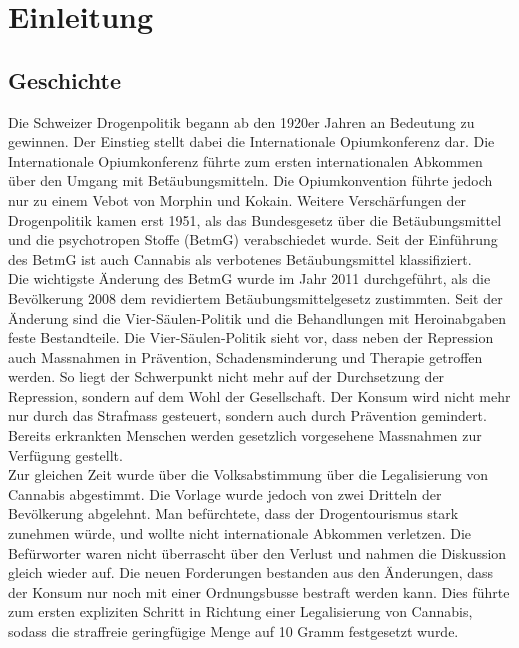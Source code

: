 \documentclass[../main.tex]{subfiles}
\begin{document}
	 \section{Einleitung}
	 
	 \subsection{Geschichte}
	 Die Schweizer Drogenpolitik begann ab den 1920er Jahren an Bedeutung zu gewinnen. 
	 Der Einstieg stellt dabei die Internationale Opiumkonferenz dar. 
	 Die Internationale Opiumkonferenz führte zum ersten internationalen Abkommen über den Umgang mit Betäubungsmitteln. 
	 Die Opiumkonvention führte jedoch nur zu einem Vebot von Morphin und Kokain. 
	 Weitere Verschärfungen der Drogenpolitik kamen erst 1951, als das Bundesgesetz über die Betäubungsmittel und die psychotropen Stoffe (BetmG) verabschiedet wurde.
	 Seit der Einführung des BetmG ist auch Cannabis als verbotenes Betäubungsmittel klassifiziert.\\	 
	 
	 \noindent
	 Die wichtigste Änderung des BetmG wurde im Jahr 2011 durchgeführt, als die Bevölkerung 2008 dem revidiertem Betäubungsmittelgesetz zustimmten. 
	 Seit der Änderung sind die Vier-Säulen-Politik und die Behandlungen mit Heroinabgaben feste Bestandteile. Die Vier-Säulen-Politik sieht vor, dass neben der Repression auch Massnahmen in Prävention, Schadensminderung und Therapie getroffen werden. 
	 So liegt der Schwerpunkt nicht mehr auf der Durchsetzung der Repression, sondern auf dem Wohl der Gesellschaft.
	 Der Konsum wird nicht mehr nur durch das Strafmass gesteuert, sondern auch durch Prävention gemindert. 
	 Bereits erkrankten Menschen werden gesetzlich vorgesehene Massnahmen zur Verfügung gestellt.\\
	 
	 \noindent
	 Zur gleichen Zeit wurde über die Volksabstimmung über die Legalisierung von Cannabis abgestimmt.
	 Die Vorlage wurde jedoch von zwei Dritteln der Bevölkerung abgelehnt.
	 Man befürchtete, dass der Drogentourismus stark zunehmen würde, und wollte nicht internationale Abkommen verletzen.
	 Die Befürworter waren nicht überrascht über den Verlust und nahmen die Diskussion gleich wieder auf. 
	 Die neuen Forderungen bestanden aus den Änderungen, dass der Konsum nur noch mit einer Ordnungsbusse bestraft werden kann. 
	 Dies führte zum ersten expliziten Schritt in Richtung einer Legalisierung von Cannabis, sodass die straffreie geringfügige Menge auf 10 Gramm festgesetzt wurde.
	 
\end{document}
